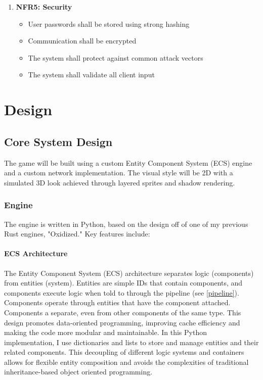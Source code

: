 \documentclass{article}
\begin{document}
\begin{enumerate}
    \item \textbf{NFR5: Security}
    \begin{itemize}
        \item User passwords shall be stored using strong hashing
        \item Communication shall be encrypted
        \item The system shall protect against common attack vectors
        \item The system shall validate all client input
    \end{itemize}
\end{enumerate}

\section{Design}

\subsection{Core System Design}

The game will be built using a custom Entity Component System (ECS) engine and a custom network implementation. The visual style will be 2D with a simulated 3D look achieved through layered sprites and shadow rendering.

\subsubsection{Engine}

The engine is written in Python, based on the design off of one of my previous Rust engines, "Oxidized." Key features include:

\paragraph{ECS Architecture}

The Entity Component System (ECS) architecture separates logic (components) from entities (system). Entities are simple IDs that contain components, and components execute logic when told to through the pipeline (see \ref{pipeline}). Components operate through entities that have the component attached. Components a separate, even from other components of the same type. This design promotes data-oriented programming, improving cache efficiency and making the code more modular and maintainable. In this Python implementation, I use dictionaries and lists to store and manage entities and their related components. This decoupling of different logic systems and containers allows for flexible entity composition and avoids the complexities of traditional inheritance-based object oriented programming.
\end{document}
